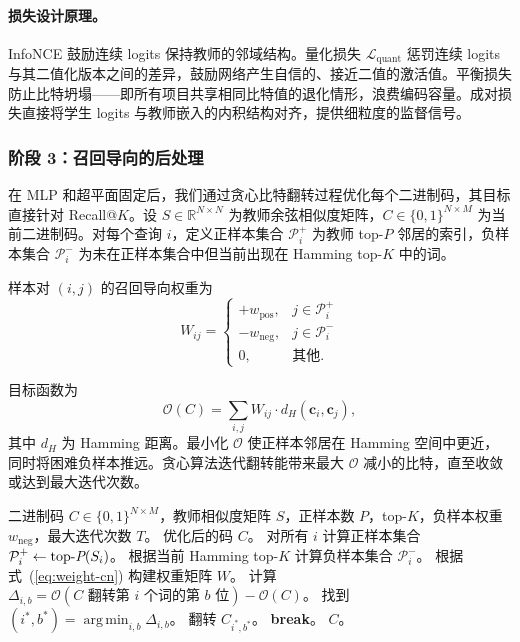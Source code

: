 \documentclass[11pt,a4paper]{article}
\DeclareMathOperator*{\argmin}{arg\,min}
\begin{document}
\paragraph{损失设计原理。} InfoNCE 鼓励连续 logits 保持教师的邻域结构。量化损失 $\mathcal{L}_{\text{quant}}$ 惩罚连续 logits 与其二值化版本之间的差异，鼓励网络产生自信的、接近二值的激活值。平衡损失防止比特坍塌——即所有项目共享相同比特值的退化情形，浪费编码容量。成对损失直接将学生 logits 与教师嵌入的内积结构对齐，提供细粒度的监督信号。

\subsubsection{阶段 3：召回导向的后处理}

在 MLP 和超平面固定后，我们通过贪心比特翻转过程优化每个二进制码，其目标直接针对 Recall@$K$。设 $S \in \mathbb{R}^{N \times N}$ 为教师余弦相似度矩阵，$C \in \{0,1\}^{N \times M}$ 为当前二进制码。对每个查询 $i$，定义正样本集合 $\mathcal{P}_i^+$ 为教师 top-$P$ 邻居的索引，负样本集合 $\mathcal{P}_i^-$ 为未在正样本集合中但当前出现在 Hamming top-$K$ 中的词。

样本对 $(i,j)$ 的召回导向权重为
\begin{equation}
\label{eq:weight-cn}
    W_{ij} =
    \begin{cases}
        +w_{\text{pos}}, & j \in \mathcal{P}_i^+ \\
        -w_{\text{neg}}, & j \in \mathcal{P}_i^- \\
        0, & \text{其他}.
    \end{cases}
\end{equation}

目标函数为
\begin{equation}
\label{eq:objective-cn}
    \mathcal{O}(C) = \sum_{i,j} W_{ij} \cdot d_H(\mathbf{c}_i, \mathbf{c}_j),
\end{equation}
其中 $d_H$ 为 Hamming 距离。最小化 $\mathcal{O}$ 使正样本邻居在 Hamming 空间中更近，同时将困难负样本推远。贪心算法迭代翻转能带来最大 $\mathcal{O}$ 减小的比特，直至收敛或达到最大迭代次数。

\begin{algorithm}[htbp]
\caption{召回导向的贪心比特翻转优化。}
\label{alg:postprocess-cn}
\begin{algorithmic}[1]
\Require 二进制码 $C \in \{0,1\}^{N \times M}$，教师相似度矩阵 $S$，正样本数 $P$，top-$K$，负样本权重 $w_{\text{neg}}$，最大迭代次数 $T$。
\Ensure 优化后的码 $C$。
\State 对所有 $i$ 计算正样本集合 $\mathcal{P}_i^+ \leftarrow \operatorname{top-\emph{P}}(S_i)$。
    \State 根据当前 Hamming top-$K$ 计算负样本集合 $\mathcal{P}_i^-$。
    \State 根据式~(\ref{eq:weight-cn}) 构建权重矩阵 $W$。
    \State 计算 $\Delta_{i,b} = \mathcal{O}(C \text{ 翻转第 } i \text{ 个词的第 } b \text{ 位}) - \mathcal{O}(C)$。
    \State 找到 $(i^*, b^*) = \argmin_{i,b} \Delta_{i,b}$。
        \State 翻转 $C_{i^*, b^*}$。
    \Else
        \State \textbf{break}。
    \EndIf
\EndFor
\State \Return $C$。
\end{algorithmic}
\end{algorithm}
\end{document}
